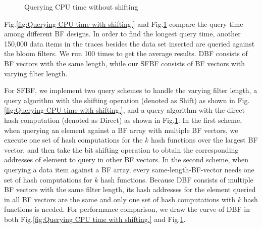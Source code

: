 \documentclass[10pt,journal,letterpaper]{IEEEtran}
\newcommand{\rev}[1]{\uwave{#1}}
\newcommand{\note}[1]{{\sffamily\itshape\bfseries\uline{#1}}}
\begin{document}
\begin{figure}[!htb]
{\label{fig:QueryingCPUtimewithoutshifting test1 actualdata webcache 1.}}
\caption{Querying CPU time without shifting}
\label{fig:Querying CPU time without shifting.}
\end{figure}




Fig.\ref{fig:Querying CPU time with shifting.} and Fig.\ref{fig:Querying CPU time without shifting.} compare the query time among different BF designs. In order to find the longest query time, another 150,000 data items \rev{besides the first 30,000 data items}
 in the traces besides the data set inserted are queried against the bloom filters. We run 100 times to get the average results. DBF consists of BF vectors with the same length, while our SFBF consists of BF vectors with varying filter length.

For SFBF, we implement two query schemes to handle the varying filter length, a query algorithm with the shifting operation (denoted as Shift) as shown in Fig.\ref{fig:Querying CPU time with shifting.}, and a query algorithm with the direct hash computation (denoted as Direct) as shown in Fig.\ref{fig:Querying CPU time without shifting.}. In the first scheme, when querying an element against a BF array with multiple BF vectors, we execute one set of hash computations for the $k$ hash functions over the largest BF vector, and then take the bit shifting operation to obtain the corresponding addresses of element to query in other BF vectors. In the second scheme, when querying a data item against a BF array, every same-length-BF-vector needs one set of hash computations for $k$ hash functions. Because DBF consists of multiple BF vectors with the same filter length, its  hash addresses for the element queried in all BF vectors are the same and only one set of hash computations with $k$ hash functions is needed. For performance comparison, we draw the curve of DBF in both Fig.\ref{fig:Querying CPU time with shifting.} and Fig.\ref{fig:Querying CPU time without shifting.}.
\end{document}
